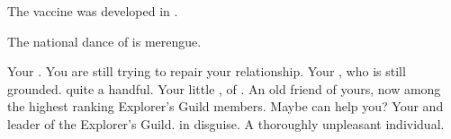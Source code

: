 \documentclass[char]{NeptuneBall}
\begin{document}
\begin{itemz}[Trivia]
  \item The \ppolio{} vaccine was developed in \pCity{}.
  \item The national dance of \pAtlantis{} is merengue.
\end{itemz}

\begin{contacts}
  \contact{\cKing{}} Your \cKing{\parent}. You are still trying to repair your relationship.
  \contact{\cWillow{}} Your \cWillow{\offspring}, who is still grounded. \cWillow{\They} \cWillow{\are} quite a handful.
  \contact{\cPrincess{}} Your little \cPrincess{\sibling}, \cPrincess{\prince} of \pAtlantis{}.
  \contact{\cPriest{}} An old friend of yours, now among the highest ranking Explorer's Guild members. Maybe \cPriest{\they} can help you?
  \contact{\cPlant{}} Your \cPlant{\uncle} and leader of the Explorer's Guild.
	\contact{\cWitch{}} \cWitch{} in disguise. A thoroughly unpleasant individual.
\end{contacts}
\end{document}
